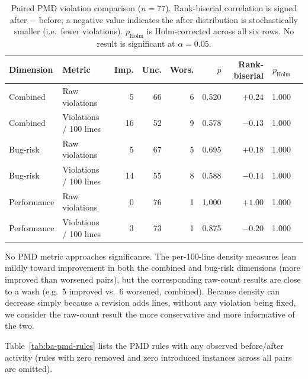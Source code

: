 \begin{table}[htbp]
\centering
\caption{Paired PMD violation comparison ($n=77$). Rank-biserial
correlation is signed after $-$ before; a negative value indicates the
after distribution is stochastically smaller (i.e.\ fewer violations).
$p_{\text{Holm}}$ is Holm-corrected across all six rows. No result is
significant at $\alpha=0.05$.}
\label{tab:ba-pmd}
\small
\begin{tabular}{llrrrrrrr}
\toprule
Dimension & Metric & Imp. & Unc. & Wors. & $p$ & Rank-biserial & $p_{\text{Holm}}$ \\
\midrule
Combined     & Raw violations         & 5  & 66 & 6 & 0.520 & $+0.24$ & 1.000 \\
Combined     & Violations / 100 lines & 16 & 52 & 9 & 0.578 & $-0.13$ & 1.000 \\
Bug-risk     & Raw violations         & 5  & 67 & 5 & 0.695 & $+0.18$ & 1.000 \\
Bug-risk     & Violations / 100 lines & 14 & 55 & 8 & 0.588 & $-0.14$ & 1.000 \\
Performance  & Raw violations         & 0  & 76 & 1 & 1.000 & $+1.00$ & 1.000 \\
Performance  & Violations / 100 lines & 3  & 73 & 1 & 0.875 & $-0.20$ & 1.000 \\
\bottomrule
\end{tabular}
\end{table}

No PMD metric approaches significance. The per-100-line density measures
lean mildly toward improvement in both the combined and bug-risk
dimensions (more improved than worsened pairs), but the corresponding
raw-count results are close to a wash (e.g.\ 5 improved vs.\ 6 worsened,
combined). Because density can decrease simply because a revision adds
lines, without any violation being fixed, we consider the raw-count
result the more conservative and more informative of the two.

Table~\ref{tab:ba-pmd-rules} lists the PMD rules with any observed
before/after activity (rules with zero removed and zero introduced
instances across all pairs are omitted).


